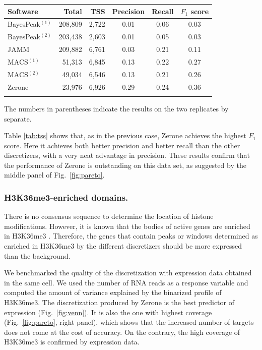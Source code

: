 \documentclass{bioinfo}
\begin{document}
\begin{table}[!t]
{\begin{tabular}{lrrccc}
        \toprule
        \textbf{Software}  & \textbf{Total}  & \textbf{TSS} &
        \textbf{Precision} & \textbf{Recall} & \textbf{$F_{1}$ score} \\
        \midrule
        BayesPeak$^{(1)}$ & 208,809 & 2,722 & 0.01 & 0.06 & 0.03 \\
        BayesPeak$^{(2)}$ & 203,438 & 2,603 & 0.01 & 0.05 & 0.03 \\
        JAMM              & 209,882 & 6,761 & 0.03 & 0.21 & 0.11 \\
        MACS$^{(1)}$      &  51,313 & 6,845 & 0.13 & 0.22 & 0.27 \\
        MACS$^{(2)}$      &  49,034 & 6,546 & 0.13 & 0.21 & 0.26 \\
        Zerone            &  23,976 & 6,926 & 0.29 & 0.24 & 0.36 \\
        \botrule
\end{tabular}}{The numbers in parentheses indicate the results on the two
replicates by separate.}
\end{table}

Table \ref{tab:tss} shows that, as in the previous case, Zerone
achieves the highest $F_1$ score. Here it achieves both better
precision and better recall than the other discretizers, with a
very neat advantage in precision. These results confirm that
the performance of Zerone is outstanding on this data set, as suggested
by the middle panel of Fig.~\ref{fig:pareto}.

\subsubsection{H3K36me3-enriched domains.}
There is no consensus sequence to determine the location of histone
modifications. However, it is known that the bodies of active genes
are enriched in H3K36me3 \citep{pmid16122420,pmid23739122}. Therefore,
the genes that contain peaks or windows determined as enriched in
H3K36me3 by the different discretizers should be more expressed than
the background.

We benchmarked the quality of the discretization with expression
data obtained in the same cell. We used the number of RNA reads
as a response variable and computed the amount of variance
explained by the binarized profile of H3K36me3. The discretization
produced by Zerone is the best predictor of expression
(Fig.~\ref{fig:venn}). It is also the one with highest coverage
(Fig.~\ref{fig:pareto}, right panel), which shows that the increased number of
targets does not come at the cost of accuracy. On the contrary,
the high coverage of H3K36me3 is confirmed by expression data.
\end{document}

